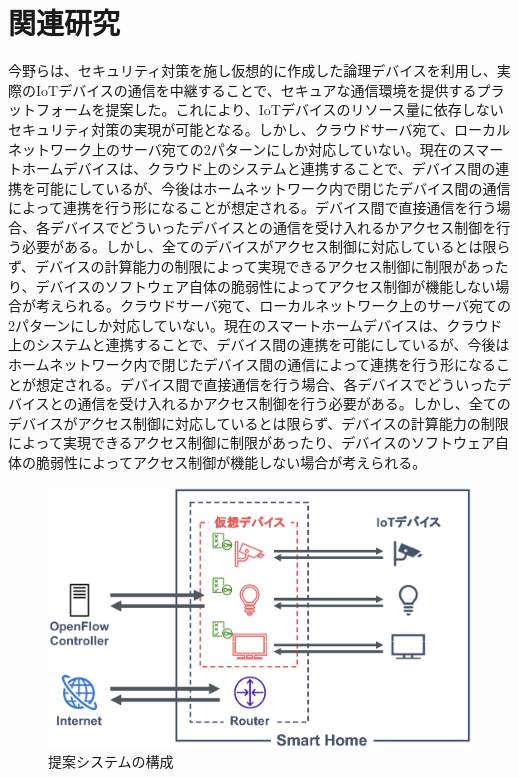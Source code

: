 \documentclass[a4paper,10pt,twocolumn,uplatex]{jsarticle}
\begin{document}
\section{関連研究}
今野らは、セキュリティ対策を施し仮想的に作成した論理デバイスを利用し、実際のIoTデバイスの通信を中継することで、セキュアな通信環境を提供するプラットフォームを提案した。これにより、IoTデバイスのリソース量に依存しないセキュリティ対策の実現が可能となる。しかし、クラウドサーバ宛て、ローカルネットワーク上のサーバ宛ての2パターンにしか対応していない。現在のスマートホームデバイスは、クラウド上のシステムと連携することで、デバイス間の連携を可能にしているが、今後はホームネットワーク内で閉じたデバイス間の通信によって連携を行う形になることが想定される\cite{d2d}。デバイス間で直接通信を行う場合、各デバイスでどういったデバイスとの通信を受け入れるかアクセス制御を行う必要がある。しかし、全てのデバイスがアクセス制御に対応しているとは限らず、デバイスの計算能力の制限によって実現できるアクセス制御に制限があったり、デバイスのソフトウェア自体の脆弱性によってアクセス制御が機能しない場合が考えられる。クラウドサーバ宛て、ローカルネットワーク上のサーバ宛ての2パターンにしか対応していない。現在のスマートホームデバイスは、クラウド上のシステムと連携することで、デバイス間の連携を可能にしているが、今後はホームネットワーク内で閉じたデバイス間の通信によって連携を行う形になることが想定される。デバイス間で直接通信を行う場合、各デバイスでどういったデバイスとの通信を受け入れるかアクセス制御を行う必要がある。しかし、全てのデバイスがアクセス制御に対応しているとは限らず、デバイスの計算能力の制限によって実現できるアクセス制御に制限があったり、デバイスのソフトウェア自体の脆弱性によってアクセス制御が機能しない場合が考えられる\cite{disap}。

\begin{figure}[!tb]
  \centering
  \includegraphics[width=\linewidth]{img/architecture.eps}
  \caption{提案システムの構成}
  \label{fig:architecture}
\end{figure}
\end{document}
